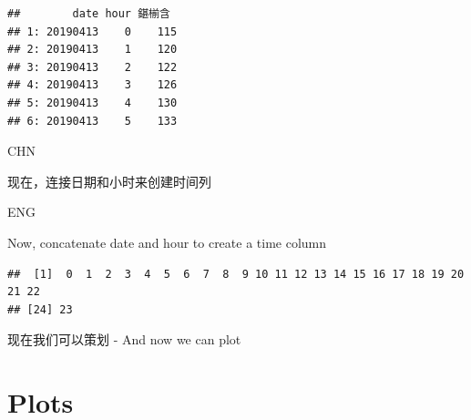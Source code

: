 \documentclass[]{book}
\newenvironment{Shaded}{\begin{snugshade}}{\end{snugshade}}
\newcommand{\DataTypeTok}[1]{\textcolor[rgb]{0.13,0.29,0.53}{#1}}
\newcommand{\DecValTok}[1]{\textcolor[rgb]{0.00,0.00,0.81}{#1}}
\newcommand{\KeywordTok}[1]{\textcolor[rgb]{0.13,0.29,0.53}{\textbf{#1}}}
\newcommand{\NormalTok}[1]{#1}
\newcommand{\OperatorTok}[1]{\textcolor[rgb]{0.81,0.36,0.00}{\textbf{#1}}}
\newcommand{\StringTok}[1]{\textcolor[rgb]{0.31,0.60,0.02}{#1}}
\begin{document}
\begin{verbatim}
##        date hour 鍖椾含
## 1: 20190413    0    115
## 2: 20190413    1    120
## 3: 20190413    2    122
## 4: 20190413    3    126
## 5: 20190413    4    130
## 6: 20190413    5    133
\end{verbatim}

CHN

现在，连接日期和小时来创建时间列

ENG

Now, concatenate date and hour to create a time column

\begin{Shaded}
\end{Shaded}

\begin{verbatim}
##  [1]  0  1  2  3  4  5  6  7  8  9 10 11 12 13 14 15 16 17 18 19 20 21 22
## [24] 23
\end{verbatim}

\begin{Shaded}
\end{Shaded}

现在我们可以策划 - And now we can plot

\hypertarget{plots}{%
\section{Plots}\label{plots}}

\begin{Shaded}
\end{Shaded}
\end{document}
